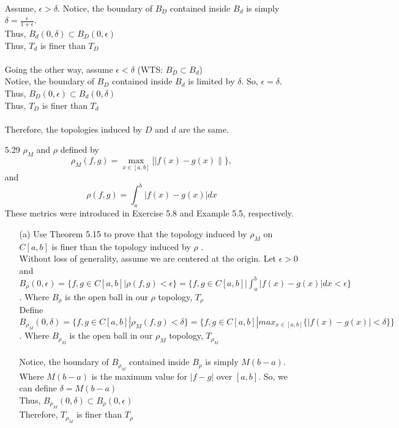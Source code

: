 \documentclass[12pt]{article}
\begin{document}
\begin{enumerate}
		\\
		Assume, $ \epsilon > \delta $. Notice, the boundary of $ B_D  $ contained inside $ B_d $ is simply $ \delta=\frac{\epsilon}{1+\epsilon} $. \\
		Thus, $ B_d(0,\delta)\subset B_D(0,\epsilon) $\\
		Thus, $ T_d $ is finer than $ T_D $\\
		\\
		Going the other way, assume $ \epsilon < \delta $ (WTS: $ B_D \subset B_d$)\\
		Notice, the boundary of $ B_D$ contained inside $ B_d $ is limited by $ \delta $.  So, $ \epsilon = \delta $.\\
		Thus, $ B_D(0,\epsilon) \subset B_d(0,\delta) $\\
		Thus, $ T_D $ is finer than $ T_d$\\
		\\
		Therefore, the topologies induced by $D$ and $d$ are the same.
		
		\item[5.29]  $\rho _ { M }$ and $\rho$ defined by
		\[\rho _ { M } ( f , g ) = \max _ { x \in [ a , b ] } [ | f ( x ) - g ( x ) \| \} ,\] and
		\[\rho ( f , g ) = \int _ { a } ^ { b } | f ( x ) - g ( x ) | d x\]
		These metrics were introduced in Exercise 5.8 and Example 5.5, respectively.
		\begin{enumerate}
			\item[(a)] Use Theorem 5.15 to prove that the topology induced by $\rho _ { M }$ on $C [ a , b ]$ is finer than the topology induced by $\rho$ .\\
			
			Without loss of generality, assume we are centered at the origin.
			Let $\epsilon > 0 $ and $B_\rho(0,\epsilon)=\{f,g\in C[a,b]|\rho(f,g)<\epsilon\}=\{f,g\in C[a,b]| \int_{a}^{b}|f(x)-g(x)|dx<\epsilon\} $. Where $ B_\rho $ is the open ball in our $ \rho $ topology, $ T_\rho $ \\
			Define $  B_{\rho_M}(0,\delta)=\{f,g\in C[a,b]|\rho_M(f,g)<\delta\}=\{f,g\in C[a,b]|max_{x\in[a,b]}\{|f(x)-g(x)|<\delta\}\} $.  Where $ B_{\rho_M} $ is the open ball in our $ \rho_M $ topology, $ T_{\rho_M} $ \\ 
			\\
			Notice, the boundary of $ B_{\rho_M}  $ contained inside $ B_\rho $ is simply $M(b-a)$. Where $ M(b-a) $ is the maximum value for $ |f-g| $ over $ [a,b] $. So, we can define $ \delta = M(b-a) $\\
			Thus, $ B_{\rho_M}(0,\delta)\subset B_\rho(0,\epsilon) $\\
			Therefore, $ T_{\rho_M} $ is finer than $ T_\rho $\\
			\\
		\end{enumerate}
		

\end{enumerate}
\end{document}
